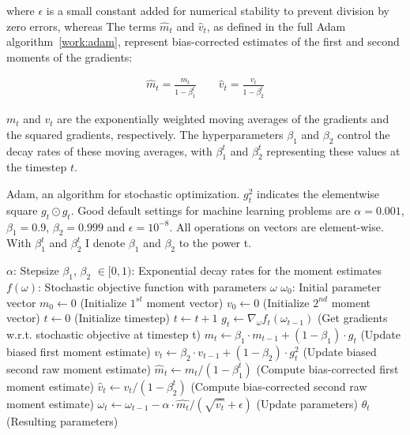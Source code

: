 where $\epsilon$ is a small constant added for numerical stability to prevent division by zero errors, whereas
The terms $\hat{m}_t$ and $\hat{v}_t$, as defined in the full Adam algorithm~\ref{work:adam}, represent bias-corrected estimates of the first 
and second moments of the gradients:

\begin{align}
    \hat{m}_t = \frac{m_t}{1 - \beta_1^t}
    \qquad
    \hat{v}_t = \frac{v_t}{1 - \beta_2^t}
\end{align}

$m_t$ and $v_t$ are the exponentially weighted moving averages of the gradients and the squared gradients, respectively.
The hyperparameters $\beta_1$ and $\beta_2$ control the decay rates of these moving averages, with $\beta_1^t$ and $\beta_2^t$ representing 
these values at the timestep $t$.\\

\begin{algorithm}
    \caption{Adam, an algorithm for stochastic optimization. $g_t^2$ indicates the elementwise
    square $g_t \odot g_t$. Good default settings for machine learning problems are $\alpha = 0.001$,
    $\beta_1 = 0.9$, $\beta_2 = 0.999$ and $\epsilon = 10^{-8}$. All operations on vectors are element-wise. With $\beta_1^t$ and $\beta_2^t$
    I denote $\beta_1$ and $\beta_2$ to the power t.}
    \label{alg:adam}
    \begin{algorithmic}
    \Require $\alpha$: Stepsize
    \Require $\beta_1$, $\beta_2$ $\in [0, 1)$: Exponential decay rates for the moment estimates
    \Require $f(\omega)$: Stochastic objective function with parameters $\omega$
    \Require $\omega_0$: Initial parameter vector
    \State $m_0 \gets 0$ (Initialize $1^{st}$ moment vector)
    \State $v_0 \gets 0$ (Initialize $2^{nd}$ moment vector)
    \State $t \gets 0$ (Initialize timestep)
    \State $t \gets t + 1$
    \State $g_t \gets \nabla_{\omega} f_t(\omega_{t-1}) $ (Get gradients w.r.t. stochastic objective at timestep t)
    \State $m_t \gets \beta_1 \cdot m_{t-1} + (1 - \beta_1) \cdot g_t$ (Update biased first moment estimate)
    \State $v_t \gets \beta_2 \cdot v_{t-1} + (1 - \beta_2) \cdot g_t^2$ (Update biased second raw moment estimate)
    \State $\hat{m}_t \gets m_t / (1 - \beta^t_1)$ (Compute bias-corrected first moment estimate)
    \State $\hat{v}_t \gets v_t / (1 - \beta^t_2)$ (Compute bias-corrected second raw moment estimate)
    \State $\omega_t \gets \omega_{t-1} - \alpha \cdot \hat{m_t} / (\sqrt{\hat{v_t}} + \epsilon)$ (Update parameters)
    \EndWhile
    \State \Return $\theta_t$ (Resulting parameters)
\end{algorithmic}
\label{work:adam}
\end{algorithm}

